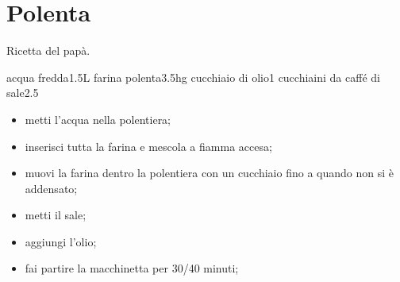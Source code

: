 \section{Polenta}

Ricetta del papà.

\generalRecipeInfos{}

\ingredienti%
    {acqua fredda}{1.5L}%
    {farina polenta}{3.5hg}%
    {cucchiaio di olio}{1}%
    {cucchiaini da caffé di sale}{2.5}%


\begin{itemize}
    \item metti l'acqua nella polentiera;
    \item inserisci tutta la farina e mescola a fiamma accesa;
    \item muovi la farina dentro la polentiera con un cucchiaio fino a quando non si è addensato;
    \item metti il sale;
    \item aggiungi l'olio;
    \item fai partire la macchinetta per 30/40 minuti;
\end{itemize}